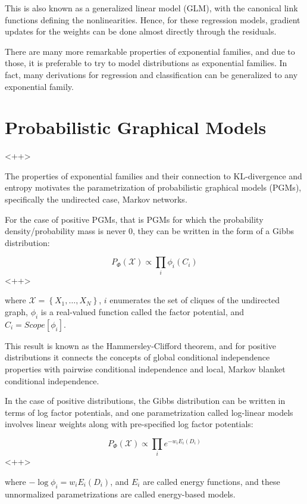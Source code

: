 \documentclass[a4paper]{article}
\begin{document}
This is also known as a generalized linear model (GLM), with the canonical link functions defining the nonlinearities. 
Hence, for these regression models, gradient updates for the weights can be done almost directly through the residuals.

There are many more remarkable properties of exponential families, and due to those, it is preferable to try to model distributions as exponential families.
In fact, many derivations for regression and classification can be generalized to any exponential family.

\section{Probabilistic Graphical Models}<++>

The properties of exponential families and their connection to KL-divergence and entropy motivates the parametrization of probabilistic graphical models (PGMs), specifically the undirected case, Markov networks.

For the case of positive PGMs, that is PGMs for which the probability density/probability mass is never 0, they can be written in the form of a Gibbs distribution:

\begin{equation}
  P_{\Phi} ( \mathcal{X} ) \propto \prod_i \phi_i(C_i)
  \label{<++>}
\end{equation}<++>

where $\mathcal{X} = \left\{ X_1, \ldots, X_N \right\}$, $i$ enumerates the set of cliques of the undirected graph, $\phi_i$ is a real-valued function called the factor potential, and $C_i = Scope[\phi_i]$.

This result is known as the Hammersley-Clifford theorem, and for positive distributions it connects the concepts of global conditional independence properties with pairwise conditional independence and local, Markov blanket conditional independence.

In the case of positive distributions, the Gibbs distribution can be written in terms of log factor potentials, and one parametrization called log-linear models involves linear weights along with pre-specified log factor potentials:

\begin{equation}
  P_{\Phi} (\mathcal{X}) \propto \prod_i e^{ -w_i E_i(D_i) }
  \label{<++>}
\end{equation}<++>

where $ - \log \phi_i = w_i E_i(D_i)$, and $E_i$ are called energy functions, and these unnormalized parametrizations are called energy-based models.
\end{document}
